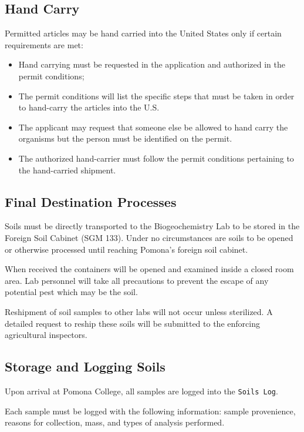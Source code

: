 \documentclass[12pt]{../SOP3}\usepackage[]{graphicx}\usepackage[]{color}
\begin{document}
\subsection{Hand Carry}

\NP Permitted articles may be hand carried into the United States only if certain requirements are met: 

\begin{itemize}
  \item Hand carrying must be requested in the application and authorized in the permit conditions;
  \item The permit conditions will list the specific steps that must be taken in order to hand-carry the articles into the U.S. 
  \item The applicant may request that someone else be allowed to hand carry the organisms but the person must be identified on the permit.
  \item The authorized hand-carrier must follow the permit conditions pertaining to the hand-carried shipment.
\end{itemize}

\subsection{Final Destination Processes}

\NP Soils must be directly transported to the Biogeochemistry Lab to be stored in the Foreign Soil Cabinet (SGM 133). Under no circumstances are soils to be opened or otherwise processed until reaching Pomona's foreign soil cabinet. 

\NP When received the containers will be opened and examined inside a closed room area. Lab personnel will take all precautions to prevent the escape of any potential pest which may be the soil. 

\NP Reshipment of soil samples to other labs will not occur unless sterilized. A detailed request to reship these soils will be submitted to the enforcing agricultural inspectors. 

\subsection{Storage and Logging Soils}

\NP Upon arrival at Pomona College, all samples are logged into the \texttt{Soils Log}.

\NP Each sample must be logged with the following information: sample provenience, reasons for collection, mass, and types of analysis performed.
\end{document}
